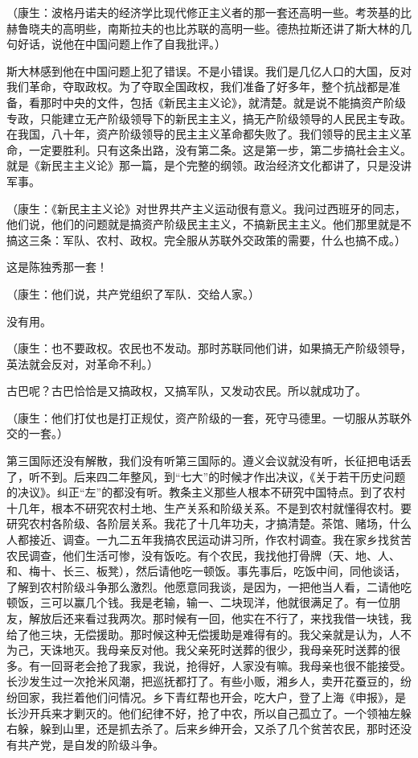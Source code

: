 （康生：波格丹诺夫的经济学比现代修正主义者的那一套还高明一些。考茨基的比赫鲁晓夫的高明些，南斯拉夫的也比苏联的高明一些。德热拉斯还讲了斯大林的几句好话，说他在中国问题上作了自我批评。）

斯大林感到他在中国问题上犯了错误。不是小错误。我们是几亿人口的大国，反对我们革命，夺取政权。为了夺取全国政权，我们准备了好多年，整个抗战都是准备，看那时中央的文件，包括《新民主主义论》，就清楚。就是说不能搞资产阶级专政，只能建立无产阶级领导下的新民主主义，搞无产阶级领导的人民民主专政。在我国，八十年，资产阶级领导的民主主义革命都失败了。我们领导的民主主义革命，一定要胜利。只有这条出路，没有第二条。这是第一步，第二步搞社会主义。就是《新民主主义论》那一篇，是个完整的纲领。政治经济文化都讲了，只是没讲军事。

（康生：《新民主主义论》对世界共产主义运动很有意义。我问过西班牙的同志，他们说，他们的问题就是搞资产阶级民主主义，不搞新民主主义。他们那里就是不搞这三条：军队、农村、政权。完全服从苏联外交政策的需要，什么也搞不成。）

这是陈独秀那一套！

（康生：他们说，共产党组织了军队．交给人家。）

没有用。

（康生：也不要政权。农民也不发动。那时苏联同他们讲，如果搞无产阶级领导，英法就会反对，对革命不利。）

古巴呢？古巴恰恰是又搞政权，又搞军队，又发动农民。所以就成功了。

（康生：他们打仗也是打正规仗，资产阶级的一套，死守马德里。一切服从苏联外交的一套。）

第三国际还没有解散，我们没有听第三国际的。遵义会议就没有听，长征把电话丢了，听不到。后来四二年整风，到“七大”的时候才作出决议，《关于若干历史问题的决议》。纠正“左”的都没有听。教条主义那些人根本不研究中国特点。到了农村十几年，根本不研究农村土地、生产关系和阶级关系。不是到农村就懂得农村。要研究农村各阶级、各阶层关系。我花了十几年功夫，才搞清楚。茶馆、赌场，什么人都接近、调查。一九二五年我搞农民运动讲习所，作农村调查。我在家乡找贫苦农民调查，他们生活可惨，没有饭吃。有个农民，我找他打骨牌（天、地、人、和、梅十、长三、板凳），然后请他吃一顿饭。事先事后，吃饭中间，同他谈话，了解到农村阶级斗争那么激烈。他愿意同我谈，是因为，一把他当人看，二请他吃顿饭，三可以赢几个钱。我是老输，输一、二块现洋，他就很满足了。有一位朋友，解放后还来看过我两次。那时候有一回，他实在不行了，来找我借一块钱，我给了他三块，无偿援助。那时候这种无偿援助是难得有的。我父亲就是认为，人不为己，天诛地灭。我母亲反对他。我父亲死时送葬的很少，我母亲死时送葬的很多。有一回哥老会抢了我家，我说，抢得好，人家没有嘛。我母亲也很不能接受。长沙发生过一次抢米风潮，把巡抚都打了。有些小贩，湘乡人，卖开花蚕豆的，纷纷回家，我拦着他们问情况。乡下青红帮也开会，吃大户，登了上海《申报》，是长沙开兵来才剿灭的。他们纪律不好，抢了中农，所以自己孤立了。一个领袖左躲右躲，躲到山里，还是抓去杀了。后来乡绅开会，又杀了几个贫苦农民，那时还没有共产党，是自发的阶级斗争。

